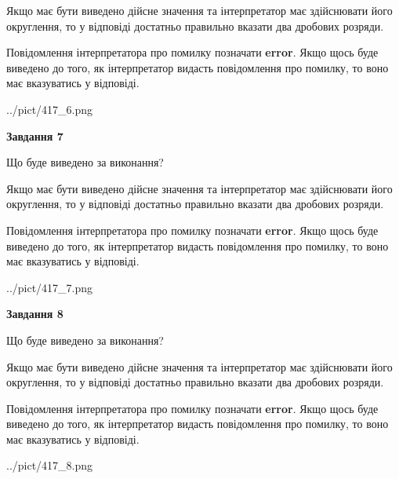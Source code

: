 \documentclass[12pt, ukrainian]{article}
\begin{document}
{\begin {Large}
Якщо має бути виведено дійсне значення та інтерпретатор має здійснювати його округлення, 
то у відповіді достатньо правильно вказати два дробових розряди.

Повідомлення інтерпретатора про помилку позначати \textbf{error}.
Якщо щось буде виведено до того, як інтерпретатор видасть повідомлення про помилку, 
то воно має вказуватись у відповіді. \par

\begin{center}
	{../pict/417_6.png}
\end{center}
\newpage

{\begin {center}\textbf{Завдання 7}\end {center}}\par
Що буде виведено за виконання? \par

Якщо має бути виведено дійсне значення та інтерпретатор має здійснювати його округлення, 
то у відповіді достатньо правильно вказати два дробових розряди.

Повідомлення інтерпретатора про помилку позначати \textbf{error}.
Якщо щось буде виведено до того, як інтерпретатор видасть повідомлення про помилку, 
то воно має вказуватись у відповіді. \par

\begin{center}
	{../pict/417_7.png}
\end{center}
\newpage

{\begin {center}\textbf{Завдання 8}\end {center}}\par
Що буде виведено за виконання? \par

Якщо має бути виведено дійсне значення та інтерпретатор має здійснювати його округлення, 
то у відповіді достатньо правильно вказати два дробових розряди.

Повідомлення інтерпретатора про помилку позначати \textbf{error}.
Якщо щось буде виведено до того, як інтерпретатор видасть повідомлення про помилку, 
то воно має вказуватись у відповіді. \par

\begin{center}
	{../pict/417_8.png}
\end{center}
\newpage


\end{Large}}
\end{document}
